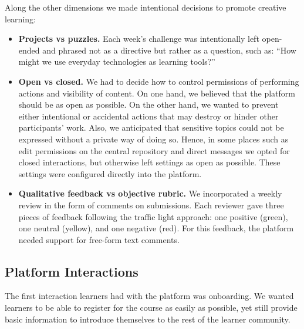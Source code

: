 \documentclass[12pt,twoside]{mitthesis}
\begin{document}
Along the other dimensions we made intentional decisions to promote creative learning:
\begin{itemize}
\item \textbf{Projects vs puzzles.} Each week's challenge was intentionally left open-ended and phrased not as a directive but rather as a question, such as: ``How might we use everyday technologies as learning tools?''
\item \textbf{Open vs closed.} We had to decide how to control permissions of performing actions and visibility of content. On one hand, we believed that the platform should be as open as possible. On the other hand, we wanted to prevent either intentional or accidental actions that may destroy or hinder other participants' work. Also, we anticipated that sensitive topics could not be expressed without a private way of doing so. Hence, in some places such as edit permissions on the central repository and direct messages we opted for closed interactions, but otherwise left settings as open as possible. These settings were configured directly into the platform.
\item \textbf{Qualitative feedback vs objective rubric.} We incorporated a weekly review in the form of comments on submissions. Each reviewer gave three pieces of feedback following the traffic light approach: one positive (green), one neutral (yellow), and one negative (red). For this feedback, the platform needed support for free-form text comments.
\end{itemize}

\subsection{Platform Interactions}

The first interaction learners had with the platform was onboarding. We wanted learners to be able to register for the course as easily as possible, yet still provide basic information to introduce themselves to the rest of the learner community.
\end{document}
